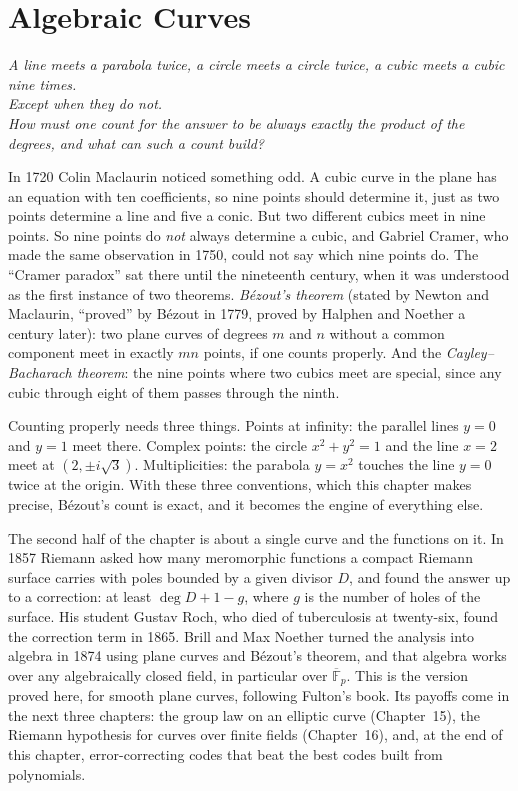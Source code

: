 \chapter{Algebraic Curves}
\begin{center}\itshape
A line meets a parabola twice, a circle meets a circle twice, a cubic meets a cubic nine times.\\
Except when they do not.\\
How must one count for the answer to be always exactly the product of the degrees, and what can such a count build?
\end{center}

In 1720 Colin Maclaurin noticed something odd. A cubic curve in the plane has an equation with ten coefficients, so nine points should
determine it, just as two points determine a line and five a conic. But two different cubics meet in nine points. So nine points do
\emph{not} always determine a cubic, and Gabriel Cramer, who made the same observation in 1750, could not say which nine points do.
The ``Cramer paradox'' sat there until the nineteenth century, when it was understood as the first instance of two theorems.
\emph{B\'ezout's theorem} (stated by Newton and Maclaurin, ``proved'' by B\'ezout in 1779, proved by Halphen and Noether a century later):
two plane curves of degrees $m$ and $n$ without a common component meet in exactly $mn$ points, if one counts properly. And the
\emph{Cayley--Bacharach theorem}: the nine points where two cubics meet are special, since any cubic through eight of them passes through
the ninth.

Counting properly needs three things. Points at infinity: the parallel lines $y=0$ and $y=1$ meet there. Complex points: the circle
$x^2+y^2=1$ and the line $x=2$ meet at $(2,\pm i\sqrt3)$. Multiplicities: the parabola $y=x^2$ touches the line $y=0$ twice at the
origin. With these three conventions, which this chapter makes precise, B\'ezout's count is exact, and it becomes the engine of
everything else.

The second half of the chapter is about a single curve and the functions on it. In 1857 Riemann asked how many meromorphic functions a
compact Riemann surface carries with poles bounded by a given divisor $D$, and found the answer up to a correction: at least
$\deg D+1-g$, where $g$ is the number of holes of the surface. His student Gustav Roch, who died of tuberculosis at twenty-six, found the
correction term in 1865. Brill and Max Noether turned the analysis into algebra in 1874 using plane curves and B\'ezout's theorem, and
that algebra works over any algebraically closed field, in particular over $\overline{\mathbb F}_p$. This is the version proved here,
for smooth plane curves, following Fulton's book. Its payoffs come in the next three chapters: the group law on an elliptic curve
(Chapter~15), the Riemann hypothesis for curves over finite fields (Chapter~16), and, at the end of this chapter, error-correcting codes
that beat the best codes built from polynomials.

